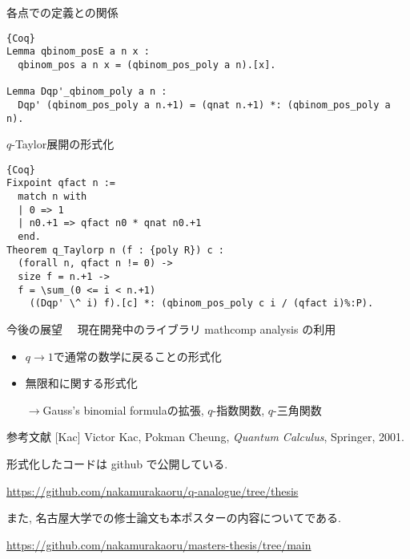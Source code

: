 \documentclass[unicode,mathserif]{beamer}
\begin{document}
\begin{frame}[fragile]
\begin{columns}[T]
\begin{column}{0.33\columnwidth}
\begin{block}{各点での定義との関係}
\begin{lstlisting}{Coq}
Lemma qbinom_posE a n x :
  qbinom_pos a n x = (qbinom_pos_poly a n).[x].
  
Lemma Dqp'_qbinom_poly a n :
  Dqp' (qbinom_pos_poly a n.+1) = (qnat n.+1) *: (qbinom_pos_poly a n).
\end{lstlisting}
		\end{block}
		
		\begin{block}{$q$-Taylor展開の形式化}
			\begin{lstlisting}{Coq}
Fixpoint qfact n :=
  match n with
  | 0 => 1
  | n0.+1 => qfact n0 * qnat n0.+1
  end.
Theorem q_Taylorp n (f : {poly R}) c :
  (forall n, qfact n != 0) ->
  size f = n.+1 ->
  f = \sum_(0 <= i < n.+1)
    ((Dqp' \^ i) f).[c] *: (qbinom_pos_poly c i / (qfact i)%:P).
\end{lstlisting}
		\end{block}
		
		\begin{block}{今後の展望}
		　現在開発中のライブラリ mathcomp analysis\cite{coq ana} の利用
			\begin{itemize}
				\item $q \to 1$で通常の数学に戻ることの形式化
				\item 無限和に関する形式化
				
				$\to$Gauss's binomial formulaの拡張, 
				$q$-指数関数, $q$-三角関数
			\end{itemize}
		\end{block}
		
		\begin{block}{参考文献}
			[Kac] Victor Kac, Pokman Cheung, {\it{Quantum Calculus}}, Springer, 2001.
		\end{block}

		形式化したコードは github で公開している. 
		
		\url{https://github.com/nakamurakaoru/q-analogue/tree/thesis}
		
		また, 名古屋大学での修士論文も本ポスターの内容についてである. 
		
		\url{https://github.com/nakamurakaoru/masters-thesis/tree/main}
		
	\end{column}
	\end{columns}
\end{frame}
\end{document}
